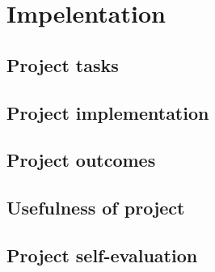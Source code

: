 \chapter{Impelentation}\label{ch:impelentation}


\section{Project tasks}\label{sec:project-tasks}



\section{Project implementation}\label{sec:project-implementation}



\section{Project outcomes}\label{sec:project-outcomes}



\section{Usefulness of project}\label{sec:usefulness-of-project}



\section{Project self-evaluation}\label{sec:project-self-evaluation}
